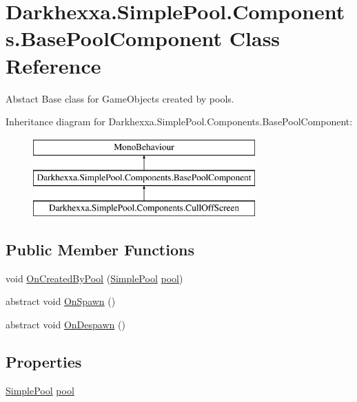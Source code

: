 \hypertarget{class_darkhexxa_1_1_simple_pool_1_1_components_1_1_base_pool_component}{\section{Darkhexxa.\-Simple\-Pool.\-Components.\-Base\-Pool\-Component Class Reference}
\label{class_darkhexxa_1_1_simple_pool_1_1_components_1_1_base_pool_component}
}


Abstact Base class for Game\-Objects created by pools.  


Inheritance diagram for Darkhexxa.\-Simple\-Pool.\-Components.\-Base\-Pool\-Component\-:\begin{figure}[H]
\begin{center}
\leavevmode
\includegraphics[height=3.000000cm]{class_darkhexxa_1_1_simple_pool_1_1_components_1_1_base_pool_component}
\end{center}
\end{figure}
\subsection*{Public Member Functions}
\begin{DoxyCompactItemize}
\item 
void \hyperlink{class_darkhexxa_1_1_simple_pool_1_1_components_1_1_base_pool_component_ad964a83becdd44af7ba763293d7f5e75}{On\-Created\-By\-Pool} (\hyperlink{class_darkhexxa_1_1_simple_pool_1_1_simple_pool}{Simple\-Pool} \hyperlink{class_darkhexxa_1_1_simple_pool_1_1_components_1_1_base_pool_component_a998b7d9d011951e36f93a020fe788022}{pool})
\item 
abstract void \hyperlink{class_darkhexxa_1_1_simple_pool_1_1_components_1_1_base_pool_component_a7173f329105a68229c0c4de3e08faf20}{On\-Spawn} ()
\item 
abstract void \hyperlink{class_darkhexxa_1_1_simple_pool_1_1_components_1_1_base_pool_component_a23947e638a808f92c5f4206ffcba8ec2}{On\-Despawn} ()
\end{DoxyCompactItemize}
\subsection*{Properties}
\begin{DoxyCompactItemize}
\item 
\hyperlink{class_darkhexxa_1_1_simple_pool_1_1_simple_pool}{Simple\-Pool} \hyperlink{class_darkhexxa_1_1_simple_pool_1_1_components_1_1_base_pool_component_a998b7d9d011951e36f93a020fe788022}{pool}
\end{DoxyCompactItemize}


